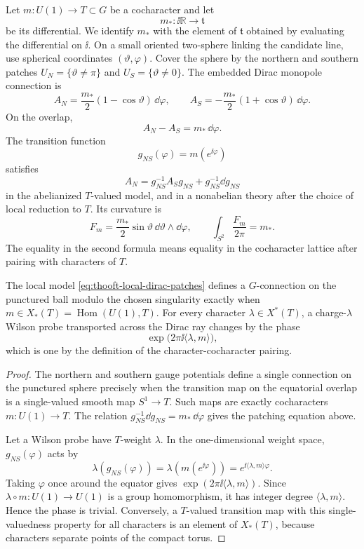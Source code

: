 Let \(m:U(1)\to T\subset G\) be a cocharacter and let
\[
  m_*:\ii\mathbb R\longrightarrow\mathfrak t
\]
be its differential.  We identify \(m_*\) with the element of
\(\mathfrak t\) obtained by evaluating the differential on \(\ii\).  On a
small oriented two-sphere linking the candidate line, use spherical
coordinates \((\vartheta,\varphi)\).  Cover the sphere by the northern and
southern patches \(U_N=\{\vartheta\ne\pi\}\) and
\(U_S=\{\vartheta\ne0\}\).  The embedded Dirac monopole connection is
\begin{equation}
  A_N=\frac{m_*}{2}(1-\cos\vartheta)\,\dd\varphi,
  \qquad
  A_S=-\frac{m_*}{2}(1+\cos\vartheta)\,\dd\varphi .
  \label{eq:thooft-local-dirac-patches}
\end{equation}
On the overlap,
\[
  A_N-A_S=m_*\,\dd\varphi .
\]
The transition function
\[
  g_{NS}(\varphi)=m(e^{\ii\varphi})
\]
satisfies
\[
  A_N=g_{NS}^{-1}A_Sg_{NS}+g_{NS}^{-1}\dd g_{NS}
\]
in the abelianized \(T\)-valued model, and in a nonabelian theory after the
choice of local reduction to \(T\).  Its curvature is
\begin{equation}
  F_m=\frac{m_*}{2}\sin\vartheta\,\dd\vartheta\wedge\dd\varphi,
  \qquad
  \int_{S^2}\frac{F_m}{2\pi}=m_* .
  \label{eq:thooft-local-flux}
\end{equation}
The equality in the second formula means equality in the cocharacter lattice
after pairing with characters of \(T\).

\begin{lemma}
\label{lem:thooft-cocharacter-criterion}
The local model \eqref{eq:thooft-local-dirac-patches} defines a
\(G\)-connection on the punctured ball modulo the chosen singularity exactly
when \(m\in X_*(T)=\operatorname{Hom}(U(1),T)\).  For every character
\(\lambda\in X^*(T)\), a charge-\(\lambda\) Wilson probe transported across
the Dirac ray changes by the phase
\[
  \exp\!\bigl(2\pi\ii\langle\lambda,m\rangle\bigr),
\]
which is one by the definition of the character-cocharacter pairing.
\end{lemma}

\begin{proof}
The northern and southern gauge potentials define a single connection on the
punctured sphere precisely when the transition map on the equatorial overlap
is a single-valued smooth map \(S^1\to T\).  Such maps are exactly
cocharacters \(m:U(1)\to T\).  The relation
\(g_{NS}^{-1}\dd g_{NS}=m_*\,\dd\varphi\) gives the patching equation above.

Let a Wilson probe have \(T\)-weight \(\lambda\).  In the one-dimensional
weight space, \(g_{NS}(\varphi)\) acts by
\[
  \lambda(g_{NS}(\varphi))
  =
  \lambda(m(e^{\ii\varphi}))
  =
  e^{\ii\langle\lambda,m\rangle\varphi}.
\]
Taking \(\varphi\) once around the equator gives
\(\exp(2\pi\ii\langle\lambda,m\rangle)\).  Since
\(\lambda\circ m:U(1)\to U(1)\) is a group homomorphism, it has integer
degree \(\langle\lambda,m\rangle\).  Hence the phase is trivial.  Conversely,
a \(T\)-valued transition map with this single-valuedness property for all
characters is an element of \(X_*(T)\), because characters separate points of
the compact torus.
\end{proof}

